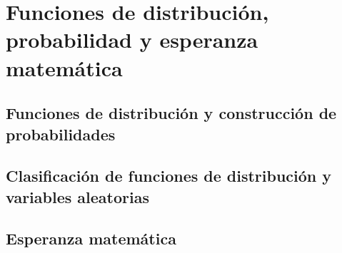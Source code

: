 \chapter{Funciones de distribución, probabilidad y esperanza matemática}

\section{Funciones de distribución y construcción de probabilidades}

\section{Clasificación de funciones de distribución y variables aleatorias}

\section{Esperanza matemática}
